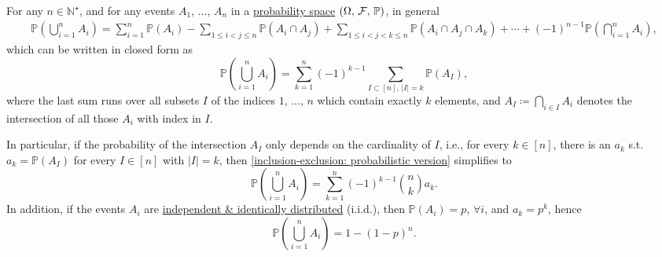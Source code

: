 \begin{dinhly}
	\label{thm: inclusion-exclusion: probabilistic version}
	For any $n\in\mathbb{N}^\star$, and for any events $A_1,\,\ldots,\,A_n$ in a \href{https://en.wikipedia.org/wiki/Probability_space}{probability space} $(\Omega,\,{\cal F},\,\mathbb{P})$, in general
	\begin{align*}
		\mathbb{P}\left(\bigcup_{i=1}^n A_i\right) = \sum_{i=1}^n \mathbb{P}(A_i) - \sum_{1 \leq i < j \leq n} \mathbb{P}(A_i\cap A_j) + \sum_{1 \leq i < j < k \leq n} \mathbb{P}(A_i\cap A_j\cap A_k) + \cdots + (-1)^{n-1}\mathbb{P}\left(\bigcap_{i=1}^n A_i\right),
	\end{align*}
	which can be written in closed form as
	\begin{equation}
		\label{inclusion-exclusion: probabilistic version}
		\mathbb{P}\left(\bigcup_{i=1}^n A_i\right) = \sum_{k=1}^n (-1)^{k-1}\sum_{I\subset[n],\,|I| = k} \mathbb{P}(A_I),
	\end{equation}
	where the last sum runs over all subsets $I$ of the indices $1,\,\ldots,\,n$ which contain exactly $k$ elements, and $\displaystyle A_I\coloneqq\bigcap_{i\in I} A_i$ denotes the intersection of all those $A_i$ with index in $I$.
	
	In particular, if the probability of the intersection $A_I$ only depends on the cardinality of $I$, i.e., for every $k\in[n]$, there is an $a_k$ s.t. $a_k = \mathbb{P}(A_I)$ for every $I\in[n]$ with $|I| = k$, then \eqref{inclusion-exclusion: probabilistic version} simplifies to
	\begin{equation*}
		\mathbb{P}\left(\bigcup_{i=1}^n A_i\right) = \sum_{k=1}^n (-1)^{k-1}\binom{n}{k}a_k.
	\end{equation*}
	In addition, if the events $A_i$ are \href{https://en.wikipedia.org/wiki/Independent_and_identically_distributed}{independent \& identically distributed} (i.i.d.), then $\mathbb{P}(A_i) = p$, $\forall i$, and $a_k = p^k$, hence
	\begin{equation*}
		\mathbb{P}\left(\bigcup_{i=1}^n A_i\right) = 1 - (1 - p)^n.
	\end{equation*}
\end{dinhly}

